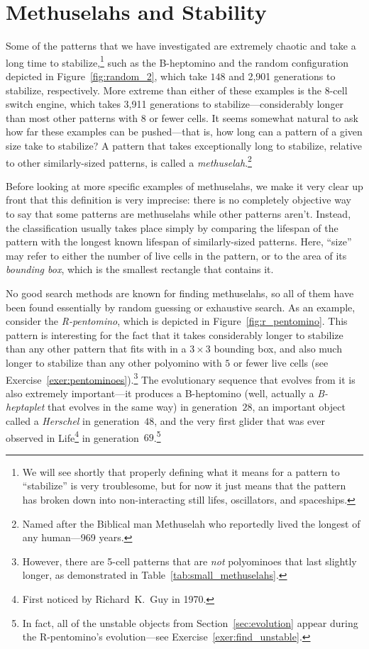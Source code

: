 \section{Methuselahs and Stability}\label{sec:methuselah}

Some of the patterns that we have investigated are extremely chaotic and take a long time to stabilize,\footnote{We will see shortly that properly defining what it means for a pattern to ``stabilize'' is very troublesome, but for now it just means that the pattern has broken down into non-interacting still lifes, oscillators, and spaceships.} such as the B-heptomino and the random configuration depicted in Figure~\ref{fig:random_2}, which take $148$ and 2,901 generations to stabilize, respectively. More extreme than either of these examples is the $8$-cell switch engine, which takes 3,911 generations to stabilize---considerably longer than most other patterns with $8$ or fewer cells. It seems somewhat natural to ask how far these examples can be pushed---that is, how long can a pattern of a given size take to stabilize? A pattern that takes exceptionally long to stabilize, relative to other similarly-sized patterns, is called a \emph{methuselah}.\footnote{Named after the Biblical man Methuselah who reportedly lived the longest of any human---969 years.}

Before looking at more specific examples of methuselahs, we make it very clear up front that this definition is very imprecise: there is no completely objective way to say that some patterns are methuselahs while other patterns aren't. Instead, the classification usually takes place simply by comparing the lifespan of the pattern with the longest known lifespan of similarly-sized patterns. Here, ``size'' may refer to either the number of live cells in the pattern, or to the area of its \emph{bounding box}, which is the smallest rectangle that contains it.

No good search methods are known for finding methuselahs, so all of them have been found essentially by random guessing or exhaustive search. As an example, consider the \emph{R-pentomino}, which is depicted in Figure~\ref{fig:r_pentomino}. This pattern is interesting for the fact that it takes considerably longer to stabilize than any other pattern that fits with in a $3 \times 3$ bounding box, and also much longer to stabilize than any other polyomino with $5$ or fewer live cells (see Exercise~\ref{exer:pentominoes}).\footnote{However, there are 5-cell patterns that are \emph{not} polyominoes that last slightly longer, as demonstrated in Table~\ref{tab:small_methuselahs}.} The evolutionary sequence that evolves from it is also extremely important---it produces a B-heptomino (well, actually a \emph{B-heptaplet} that evolves in the same way) in generation~$28$, an important object called a \emph{Herschel} in generation~$48$, and the very first glider that was ever observed in Life\footnote{First noticed by Richard~K.~Guy in 1970.} in generation~$69$.\footnote{In fact, all of the unstable objects from Section~\ref{sec:evolution} appear during the R-pentomino's evolution---see Exercise~\ref{exer:find_unstable}.}

